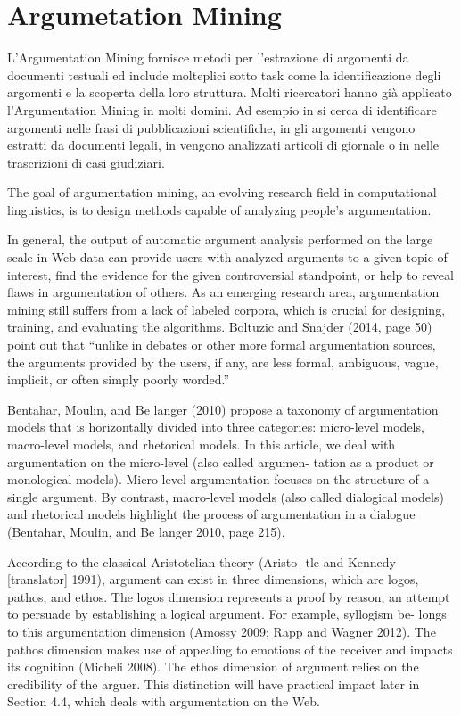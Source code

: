 \section{Argumetation Mining}
L'Argumentation Mining fornisce metodi per l'estrazione di argomenti da documenti testuali ed include molteplici sotto task come la identificazione degli argomenti e la scoperta della loro struttura. Molti ricercatori hanno già applicato l'Argumentation Mining in molti domini. Ad esempio in \cite{teufel1999annotation} si cerca di identificare argomenti nelle frasi di pubblicazioni scientifiche, in \cite{moens2007automatic} gli argomenti vengono estratti da documenti legali, in \cite{feng2011classifying} vengono analizzati articoli di giornale o in \cite{florou2013argument} nelle trascrizioni di casi giudiziari.

The goal of argumentation mining, an evolving research field in computational linguistics, is to design methods capable of analyzing people’s argumentation.

In general, the output of automatic argument analysis performed on the large scale in Web data can provide users with analyzed arguments to a given topic of interest, find the evidence for the given controversial standpoint, or help to reveal flaws in argumentation of others. As an emerging research area, argumentation mining still suffers from a lack of labeled corpora, which is crucial for designing, training, and evaluating the algorithms. Boltuzic  and Snajder (2014, page 50) point out that “unlike in debates or other more formal argumentation sources, the arguments provided by the users, if any, are less formal, ambiguous, vague, implicit, or often simply poorly worded.”

Bentahar, Moulin, and Be langer (2010) propose a taxonomy of argumentation models that is horizontally divided into three categories: micro-level models, macro-level models, and rhetorical models.
In this article, we deal with argumentation on the micro-level (also called argumen- tation as a product or monological models). Micro-level argumentation focuses on the structure of a single argument. By contrast, macro-level models (also called dialogical models) and rhetorical models highlight the process of argumentation in a dialogue (Bentahar, Moulin, and Be langer 2010, page 215).

According to the classical Aristotelian theory (Aristo- tle and Kennedy [translator] 1991), argument can exist in three dimensions, which are logos, pathos, and ethos. The logos dimension represents a proof by reason, an attempt to persuade by establishing a logical argument. For example, syllogism be- longs to this argumentation dimension (Amossy 2009; Rapp and Wagner 2012). The pathos dimension makes use of appealing to emotions of the receiver and impacts its cognition (Micheli 2008). The ethos dimension of argument relies on the credibility of the arguer. This distinction will have practical impact later in Section 4.4, which deals with argumentation on the Web.


